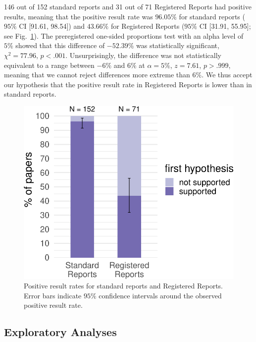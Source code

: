 \documentclass[british,,jou,floatsintext]{apa6}
\begin{document}
146 out of 152 standard reports and 31 out of 71 Registered Reports had positive results, meaning that the positive result rate was \(96.05 \%\) for standard reports (\(95 \%\) CI {[}91.61, 98.54{]}) and \(43.66 \%\) for Registered Reports (\(95 \%\) CI {[}31.91, 55.95{]}; see Fig.~\ref{fig:mainplot}).
The preregistered one-sided proportions test with an alpha level of \(5\%\) showed that this difference of \(-52.39 \%\) was statistically significant, \(\chi^2 = 77.96\), \(p < .001\).
Unsurprisingly, the difference was not statistically equivalent to a range between \(-6 \%\) and \(6 \%\) at \(\alpha = 5\%\), \(z = 7.61\), \(p > .999\), meaning that we cannot reject differences more extreme than \(6\%\).
We thus accept our hypothesis that the positive result rate in Registered Reports is lower than in standard reports.



\begin{figure}
\centering
\includegraphics{manuscript_files/figure-latex/mainplot-1.pdf}
\caption{\label{fig:mainplot}Positive result rates for standard reports and Registered Reports. Error bars indicate \(95 \%\) confidence intervals around the observed positive result rate.}
\end{figure}

\hypertarget{exploratory-analyses}{%
\subsection{Exploratory Analyses}\label{exploratory-analyses}}
\end{document}

